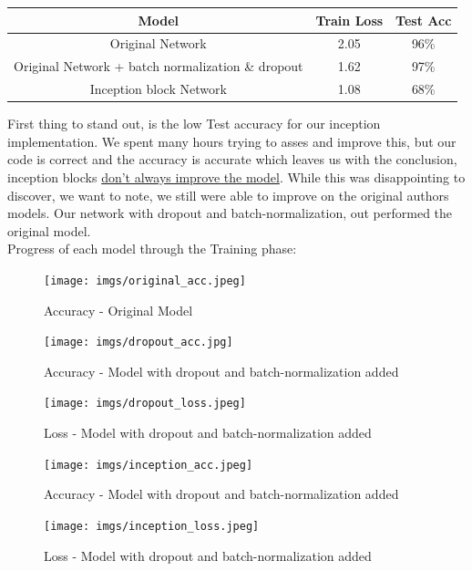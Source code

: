 \documentclass{article}
\theoremstyle{remark}
\begin{document}
\begin{center}
    \begin{tabular}{||c c c||} 
        \hline
        Model & Train Loss & Test Acc \\ [0.5ex] 
        \hline\hline
        Original Network & 2.05 & 96\% \\ 
        \hline
        Original Network + batch normalization \& dropout & 1.62 & 97\% \\
        \hline
        Inception block Network & 1.08 & 68\% \\ 
        \hline
    \end{tabular}
\end{center}
First thing to stand out, is the low Test accuracy for our inception implementation. We spent many hours trying to asses and improve this, but our code is correct and the accuracy is 
accurate which leaves us with the conclusion, inception blocks \underline{don't always improve the model}. While this was disappointing to discover, we want to note, we still were able to 
improve on the original authors models. Our network with dropout and batch-normalization, out performed the original model.\\
Progress of each model through the Training phase:
\begin{figure}[H]
    \centering
    \texttt{[image: imgs/original\_acc.jpeg]}
    \caption{Accuracy - Original Model}
\end{figure}
\begin{figure}[H]
    \centering
    \begin{minipage}{0.45\textwidth}
        \centering
        \texttt{[image: imgs/dropout\_acc.jpg]} %
        \caption{Accuracy - Model with dropout and batch-normalization added}
    \end{minipage}\hfill
    \begin{minipage}{0.45\textwidth}
        \centering
        \texttt{[image: imgs/dropout\_loss.jpeg]} %
        \caption{Loss - Model with dropout and batch-normalization added}
    \end{minipage}
\end{figure}
\begin{figure}[H]
    \centering
    \begin{minipage}{0.45\textwidth}
        \centering
        \texttt{[image: imgs/inception\_acc.jpeg]} %
        \caption{Accuracy - Model with dropout and batch-normalization added}
    \end{minipage}\hfill
    \begin{minipage}{0.45\textwidth}
        \centering
        \texttt{[image: imgs/inception\_loss.jpeg]} %
        \caption{Loss - Model with dropout and batch-normalization added}
    \end{minipage}
\end{figure}
\end{document}
